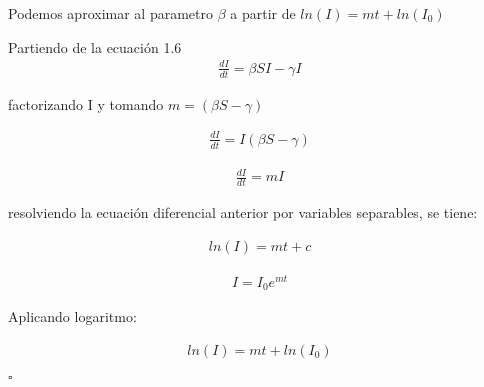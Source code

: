 \begin{Af}
Podemos aproximar al parametro $\beta$ a partir de $ln(I) = mt + ln(I_{0})$ \cite{Algeria}
\end{Af}

\begin{Dem}
Partiendo de la ecuación 1.6 
\begin{align*}
\frac{dI}{dt} = \beta SI - \gamma I
\end{align*}

factorizando I y tomando $m = \left(\beta S - \gamma \right)$

\begin{align*}
\frac{dI}{dt} = I \left( \beta S - \gamma \right)
\end{align*}

\begin{align*}
\frac{dI}{dt} = mI
\end{align*}

resolviendo la ecuación diferencial anterior por variables separables, se tiene:

\begin{align*}
ln(I) = mt + c
\end{align*}

\begin{align*}
I = I_{0} e^{mt} 
\end{align*}

Aplicando logaritmo:

\begin{align*}
ln(I) = mt + ln(I_{0})
\end{align*}

\hfill	$\square$

\end{Dem}









%